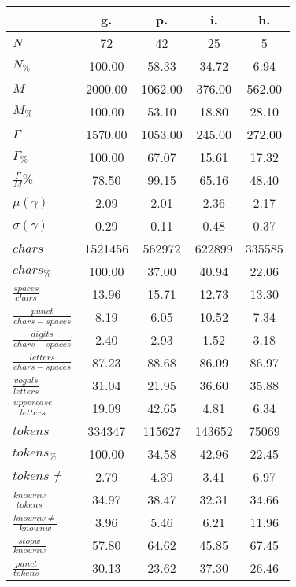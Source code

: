 \begin{table}[h!]
\begin{center}
\begin{tabular}{| l || c | c | c | c |}\hline
 & {\bf g.} & {\bf p.} & {\bf i.} & {\bf h.} \\\hline\hline
$N$ & 72  & 42  & 25  & 5 \\
$N_{\%}$ & 100.00  & 58.33  & 34.72  & 6.94 \\\hline
$M$ & 2000.00  & 1062.00  & 376.00  & 562.00 \\
$M_{\%}$ & 100.00  & 53.10  & 18.80  & 28.10 \\\hline
$\Gamma$ & 1570.00  & 1053.00  & 245.00  & 272.00 \\
$\Gamma_{\%}$ & 100.00  & 67.07  & 15.61  & 17.32 \\\hline
$\frac{\Gamma}{M}\%$ & 78.50  & 99.15  & 65.16  & 48.40 \\
$\mu(\gamma)$ & 2.09  & 2.01  & 2.36  & 2.17 \\
$\sigma(\gamma)$ & 0.29  & 0.11  & 0.48  & 0.37 \\\hline\hline
$chars$ & 1521456  & 562972  & 622899  & 335585 \\
$chars_{\%}$ & 100.00  & 37.00  & 40.94  & 22.06 \\\hline
$\frac{spaces}{chars}$ & 13.96  & 15.71  & 12.73  & 13.30 \\
$\frac{punct}{chars-spaces}$ & 8.19  & 6.05  & 10.52  & 7.34 \\
$\frac{digits}{chars-spaces}$ & 2.40  & 2.93  & 1.52  & 3.18 \\\hline
$\frac{letters}{chars-spaces}$ & 87.23  & 88.68  & 86.09  & 86.97 \\
$\frac{vogals}{letters}$ & 31.04  & 21.95  & 36.60  & 35.88 \\
$\frac{uppercase}{letters}$ & 19.09  & 42.65  & 4.81  & 6.34 \\\hline\hline
$tokens$ & 334347  & 115627  & 143652  & 75069 \\
$tokens_{\%}$ & 100.00  & 34.58  & 42.96  & 22.45 \\
$tokens \neq$ & 2.79  & 4.39  & 3.41  & 6.97 \\\hline
$\frac{knownw}{tokens}$ & 34.97  & 38.47  & 32.31  & 34.66 \\
$\frac{knownw \neq}{knownw}$ & 3.96  & 5.46  & 6.21  & 11.96 \\\hline
$\frac{stopw}{knownw}$ & 57.80  & 64.62  & 45.85  & 67.45 \\
$\frac{punct}{tokens}$ & 30.13  & 23.62  & 37.30  & 26.46 \\

\end{tabular}
\end{center}
\end{table}
